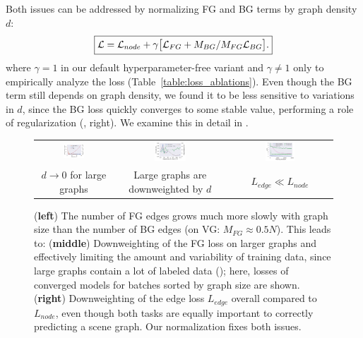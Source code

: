 \vspace{-5pt}
Both issues can be addressed by normalizing FG and BG terms by graph density $d$:
\begin{equation}
\label{eq:loss_norm}
\boxed{{\cal L} = {\cal L}_{node} + \gamma \big[ {\cal L}_{FG}  + {M_{BG}}/{M_{FG}} {\cal L}_{BG}\big].}
\end{equation}
\noindent where $\gamma=1$ in our default hyperparameter-free variant and $\gamma \neq 1$ only to empirically analyze the loss (Table~\ref{table:loss_ablations}). Even though the BG term still depends on graph density, we found it to be less sensitive to variations in $d$, since the BG loss quickly converges to some stable value, performing a role of regularization (\fig{\ref{fig:graph_density}}, right).
We examine this in detail in \secref{\ref{sec:experiments}}.

\begin{figure}%
	\centering
	\begin{small}
		\setlength{\tabcolsep}{1pt}
		\begin{tabular}{ccc}
			\includegraphics[width=0.3\textwidth,align=c]{VG_graphs_bg_b1.pdf} &
			\includegraphics[width=0.3\textwidth,align=c]{loss_adaptive4_b6_graphsize.pdf} & \includegraphics[width=0.3\textwidth,align=c]{losses_vs_iter_loss_adaptive4_b6.pdf} \\ $d \rightarrow 0 $ for large graphs & Large graphs are downweighted by $d$ & $L_{edge} \ll L_{node}$ \\
		\end{tabular}
	\end{small}
	\caption{
		\small (\textbf{left}) The number of FG edges grows much more slowly with graph size than the number of BG edges (on VG: $M_{FG}\approx 0.5N$). This leads to: (\textbf{middle}) Downweighting of the FG loss on larger graphs and effectively limiting the amount and variability of training data, since large graphs contain a lot of labeled data (\fig{\ref{fig:motivation}}); here, losses of converged models for batches sorted by graph size are shown. (\textbf{right}) Downweighting of the edge loss $L_{edge}$ overall compared to $L_{node}$, even though both tasks are equally important to correctly predicting a scene graph. Our normalization fixes both issues.}
	\label{fig:graph_density}
\end{figure}

